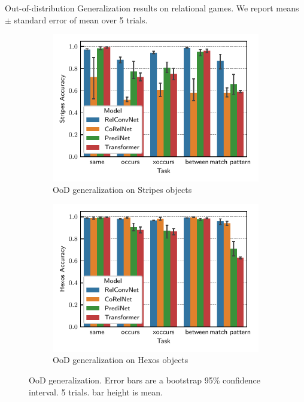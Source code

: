 \begin{table}
    \centering
    
    \caption{Out-of-distribution Generalization results on relational games. We report means $\pm$ standard error of mean over 5 trials.}
\end{table}

\begin{figure}
    \begin{subfigure}{0.5\textwidth}
        \centering
        \includegraphics[width=\textwidth]{figs/experiments/stripes_acc.pdf}
        \caption{OoD generalization on Stripes objects}
    \end{subfigure}
    \begin{subfigure}{0.5\textwidth}
        \centering
        \includegraphics[width=\textwidth]{figs/experiments/hexos_acc.pdf}
        \caption{OoD generalization on Hexos objects}
    \end{subfigure}
    \caption{OoD generalization. Error bars are a bootstrap 95\% confidence interval. 5 trials. bar height is mean.}\label{fig:ood_generalization}
\end{figure}